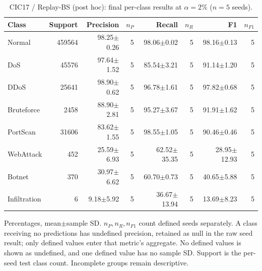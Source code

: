 \begin{table}[t]
\centering\scriptsize
\setlength{\tabcolsep}{3.3pt}
\caption{CIC17 / Replay-BS (post hoc): final per-class results at $\alpha=2\%$ ($n=5$ seeds).}\label{tab:forgetting-class-cic_ids_2017-replay-bs}
\begin{tabular}{lrrrrrrr}
\toprule
Class & Support & Precision & $n_P$ & Recall & $n_R$ & F1 & $n_{F1}$ \\
\midrule
Normal & 459564 & 98.25$\pm$0.26 & 5 & 98.06$\pm$0.02 & 5 & 98.16$\pm$0.13 & 5 \\
DoS & 45576 & 97.64$\pm$1.52 & 5 & 85.54$\pm$3.21 & 5 & 91.14$\pm$1.20 & 5 \\
DDoS & 25641 & 98.90$\pm$0.62 & 5 & 96.78$\pm$1.61 & 5 & 97.82$\pm$0.68 & 5 \\
Bruteforce & 2458 & 88.90$\pm$2.81 & 5 & 95.27$\pm$3.67 & 5 & 91.91$\pm$1.62 & 5 \\
PortScan & 31606 & 83.62$\pm$1.55 & 5 & 98.55$\pm$1.05 & 5 & 90.46$\pm$0.46 & 5 \\
WebAttack & 452 & 25.59$\pm$6.93 & 5 & 62.52$\pm$35.35 & 5 & 28.95$\pm$12.93 & 5 \\
Botnet & 370 & 30.97$\pm$6.62 & 5 & 60.70$\pm$0.73 & 5 & 40.65$\pm$5.88 & 5 \\
Infiltration & 6 & 9.18$\pm$5.92 & 5 & 36.67$\pm$13.94 & 5 & 13.69$\pm$8.23 & 5 \\
\bottomrule
\end{tabular}
\par\smallskip\begin{minipage}{0.98\textwidth}\scriptsize Percentages, mean$\pm$sample SD. $n_P,n_R,n_{F1}$ count defined seeds separately. A class receiving no predictions has undefined precision, retained as null in the raw seed result; only defined values enter that metric's aggregate. No defined values is shown as undefined, and one defined value has no sample SD. Support is the per-seed test class count. Incomplete groups remain descriptive.\end{minipage}
\end{table}

